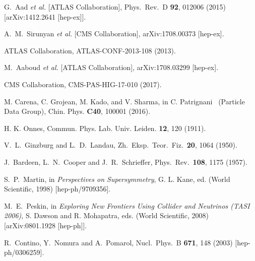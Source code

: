 \documentclass[12pt]{article}
\begin{document}
\begin{thebibliography}{99}
 G.~Aad {\it et al.} [ATLAS Collaboration],
  Phys.\ Rev.\ D {\bf 92}, 012006 (2015)
  [arXiv:1412.2641 [hep-ex]].



 A.~M.~Sirunyan {\it et al.} [CMS Collaboration],
  arXiv:1708.00373 [hep-ex].


 ATLAS Collaboration, 
  ATLAS-CONF-2013-108 (2013). 

 M.~Aaboud {\it et al.} [ATLAS Collaboration],
  arXiv:1708.03299 [hep-ex].

CMS Collaboration, CMS-PAS-HIG-17-010 (2017).




M. Carena, C. Grojean, M. Kado, and V. Sharma, in C. Patrignani \etal\
(Particle Data Group), Chin. Phys. {\bf C40}, 100001 (2016).


 H. K. Onnes, Commun. Phys. Lab. Univ. Leiden. {\bf 12}, 120 (1911).



 V.~L.~Ginzburg and L.~D.~Landau,
  Zh.\ Eksp.\ Teor.\ Fiz.\  {\bf 20}, 1064 (1950).

 J.~Bardeen, L.~N.~Cooper and J.~R.~Schrieffer,
  Phys.\ Rev.\  {\bf 108}, 1175 (1957).
 
  S.~P.~Martin,
in {\it Perspectives on Supersymmetry}, G. L. Kane, ed. (World
Scientific, 1998) 
  [hep-ph/9709356].

 M.~E.~Peskin,
in {\it Exploring New Frontiers Using Collider and Neutrinos (TASI
  2006)}, S. Dawson and R. Mohapatra, eds.   (World Scientific, 2008)
  [arXiv:0801.1928 [hep-ph]].

 R.~Contino, Y.~Nomura and A.~Pomarol,
  Nucl.\ Phys.\ B {\bf 671}, 148 (2003)
  [hep-ph/0306259].
 


\end{thebibliography}
\end{document}
